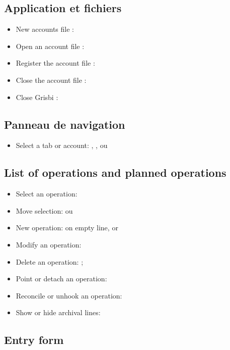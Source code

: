 \subsection{Application et fichiers}

\begin{itemize}
	\item New accounts file : 
	\item Open an account file : 
	\item Register the account file : 
	\item Close the account file : 
	\item Close Grisbi : 
\end{itemize}


\subsection{Panneau de navigation}

\begin{itemize}
	\item Select a tab or account: , ,  ou 
\end{itemize}

\subsection{List of operations and planned operations}

\begin{itemize}
	\item Select an operation: 
	\item Move selection: ou 
	\item New operation:   on empty line, or 
	\item Modify an operation: 
	\item Delete an operation:  ;
	\item Point or detach an operation:
	\item Reconcile or unhook an operation: 
	\item Show or hide archival lines: 
\end{itemize}


\subsection{Entry form }

